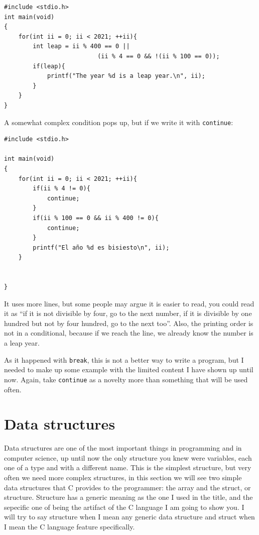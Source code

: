 \documentclass[a4paper]{article}
\begin{document}
\noindent
\begin{minipage}[H]{\linewidth}
\mbox{}
\begin{lstlisting}[style=C,
caption={Example of algorithm of leap year},
label={lst:lapExample}]
#include <stdio.h>
int main(void)
{
    for(int ii = 0; ii < 2021; ++ii){
        int leap = ii % 400 == 0 ||
                          (ii % 4 == 0 && !(ii % 100 == 0));
        if(leap){
            printf("The year %d is a leap year.\n", ii);
        }
    }
}
\end{lstlisting}
\end{minipage}

A somewhat complex condition pops up, but if we write it with \texttt{continue}:

\noindent
\begin{minipage}[H]{\linewidth}
\mbox{}
\begin{lstlisting}[style=C,
caption={Example of algorithm with continue},
label={lst:continueExample}]
#include <stdio.h>

int main(void)
{
    for(int ii = 0; ii < 2021; ++ii){
        if(ii % 4 != 0){
            continue;
        }
        if(ii % 100 == 0 && ii % 400 != 0){
            continue;
        }
        printf("El año %d es bisiesto\n", ii);
    }


}
\end{lstlisting}
\end{minipage}

It uses more lines, but some people may argue it is easier to read, you could
read it as ``if it is not divisible by four, go to the next number, if it is
divisible by one hundred but not by four hundred, go to the next too''.
Also, the printing order is not in a conditional, because if we reach the line,
we already know the number is a leap year.

As it happened with \texttt{break}, this is not a better way to write a program,
but I needed to make up some example with the limited content I have shown up
until now. Again, take \texttt{continue} as a novelty more than something that
will be used often.
\section{Data structures}
Data structures are one of the most important things in programming and
in computer science, up until now the only structure you knew were variables,
each one of a type and with a different name. This is the simplest structure,
but very often we need more complex structures, in this section we will see two
simple data structures that C provides to the programmer: the array and
the struct, or structure. Structure has a generic meaning as the one I used in
the title, and the sepecific one of being the artifact of the C language I am
going to show you. I will try to say structure when I mean any generic data
structure and struct when I mean the C language feature specifically.
\end{document}
